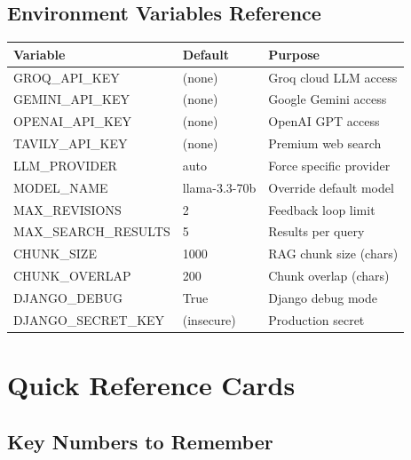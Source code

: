 \documentclass[11pt,a4paper,twoside]{report}
\begin{document}
\section{Environment Variables Reference}

\begin{longtable}{|p{4cm}|p{3cm}|p{6cm}|}
\hline
\textbf{Variable} & \textbf{Default} & \textbf{Purpose} \\
\hline
GROQ\_API\_KEY & (none) & Groq cloud LLM access \\
\hline
GEMINI\_API\_KEY & (none) & Google Gemini access \\
\hline
OPENAI\_API\_KEY & (none) & OpenAI GPT access \\
\hline
TAVILY\_API\_KEY & (none) & Premium web search \\
\hline
LLM\_PROVIDER & auto & Force specific provider \\
\hline
MODEL\_NAME & llama-3.3-70b & Override default model \\
\hline
MAX\_REVISIONS & 2 & Feedback loop limit \\
\hline
MAX\_SEARCH\_RESULTS & 5 & Results per query \\
\hline
CHUNK\_SIZE & 1000 & RAG chunk size (chars) \\
\hline
CHUNK\_OVERLAP & 200 & Chunk overlap (chars) \\
\hline
DJANGO\_DEBUG & True & Django debug mode \\
\hline
DJANGO\_SECRET\_KEY & (insecure) & Production secret \\
\hline
\end{longtable}



\chapter{Quick Reference Cards}

\section{Key Numbers to Remember}
\end{document}
